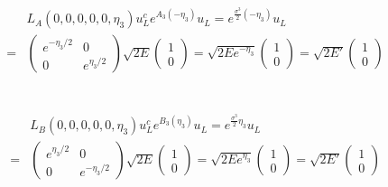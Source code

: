 \documentclass[11pt]{article}
\begin{document}
\section{ }
\begin{eqnarray}
    && L_A(0,0,0,0,0,\eta_3) u_L^c
     e^{ A_3       (-\eta_3) } u_L
     = e^{ \frac{\sigma^3}{2} (-\eta_3) }u_L \\
     &=&
     \begin{pmatrix}
       e^{-\eta_3/2} & 0 \\
       0 & e^{\eta_3/2}
     \end{pmatrix} 
     \sqrt{2E}
     \begin{pmatrix}
         1 \\ 0
     \end{pmatrix}
     =\sqrt{2E e^{-\eta_3}}
     \begin{pmatrix}
         1 \\ 0
     \end{pmatrix}
     =\sqrt{2E'}
     \begin{pmatrix}
         1 \\ 0
     \end{pmatrix}
 \end{eqnarray}

 \section{ }
 \begin{eqnarray}
    && L_B(0,0,0,0,0,\eta_3) u_L^c
     e^{ B_3       (\eta_3) } u_L
     = e^{ \frac{\sigma^3}{2} \eta_3 }u_L \\
     &=&
     \begin{pmatrix}
       e^{\eta_3/2} & 0 \\
       0 & e^{-\eta_3/2}
     \end{pmatrix} 
     \sqrt{2E}
     \begin{pmatrix}
         1 \\ 0
     \end{pmatrix}
     =\sqrt{2E e^{\eta_3}}
     \begin{pmatrix}
         1 \\ 0
     \end{pmatrix}
     =\sqrt{2E'}
     \begin{pmatrix}
         1 \\ 0
     \end{pmatrix}
 \end{eqnarray}
\end{document}
